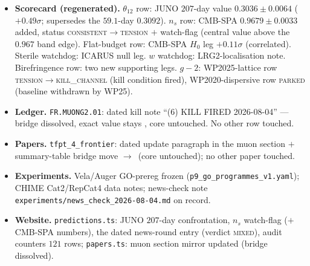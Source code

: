 \begin{itemize}[leftmargin=1.5em]
  \item \textbf{Scorecard (regenerated).} $\theta_{12}$ row: JUNO $207$-day value $0.3036\pm0.0064$ ($+0.49\sigma$; supersedes the $59.1$-day $0.3092$).  $n_s$ row: CMB-SPA $0.9679\pm0.0033$ added, status \textsc{consistent}$\to$\textsc{tension} $+$ watch-flag (central value above the $0.967$ band edge).  Flat-budget row: CMB-SPA $H_0$ leg $+0.11\sigma$ (correlated).  Sterile watchdog: ICARUS null leg.  $w$ watchdog: LRG2-localisation note.  Birefringence row: two new supporting legs.  $g{-}2$: WP2025-lattice row \textsc{tension}$\to$\textsc{kill\_channel} (kill condition fired), WP2020-dispersive row \textsc{parked} (baseline withdrawn by WP25).
  \item \textbf{Ledger.} \texttt{FR.MUONG2.01}: dated kill note ``(6) KILL FIRED 2026-08-04'' --- bridge dissolved, exact value stays \mE, core untouched.  No other row touched.
  \item \textbf{Papers.} \texttt{tfpt\_4\_frontier}: dated update paragraph in the muon section $+$ summary-table bridge move \mC$\to$\mX\ (core untouched); no other paper touched.
  \item \textbf{Experiments.} Vela/Auger GO-prereg frozen (\texttt{p9\_go\_programmes\_v1.yaml}); CHIME Cat2/RepCat4 data notes; news-check note \texttt{experiments/news\_check\_2026-08-04.md} on record.
  \item \textbf{Website.} \texttt{predictions.ts}: JUNO $207$-day confrontation, $n_s$ watch-flag ($+$ CMB-SPA numbers), the dated news-round entry (verdict \textsc{mixed}), audit counters $121$ rows; \texttt{papers.ts}: muon section mirror updated (bridge dissolved).
\end{itemize}

